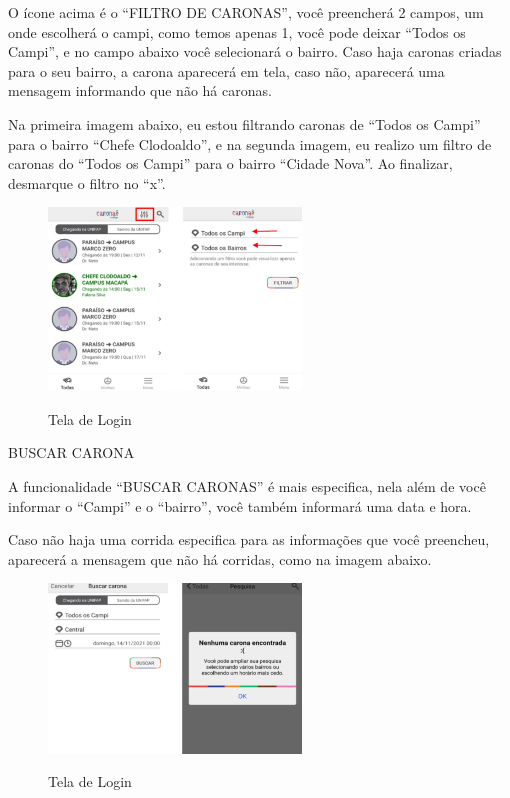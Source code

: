 O ícone acima é o “FILTRO DE CARONAS”, você preencherá 2 campos, um onde escolherá o campi, como temos apenas 1, você pode deixar “Todos os Campi”, e no campo abaixo você selecionará o bairro. Caso haja caronas criadas para o seu bairro, a carona aparecerá em tela, caso não, aparecerá uma mensagem informando que não há caronas.

Na primeira imagem abaixo, eu estou filtrando caronas de “Todos os Campi” para o bairro “Chefe Clodoaldo”, e na segunda imagem, eu realizo um filtro de caronas do “Todos os Campi” para o bairro “Cidade Nova”. Ao finalizar, desmarque o filtro no “x”.

\begin{figure}[H]
	\centering
	\caption{Tela de Login}
	\includegraphics[width=0.6\textwidth]{./04-figuras/manual/filtrar_carona.png}
	\label{fig:filtrar_carona_2}
\end{figure}

BUSCAR CARONA

A funcionalidade “BUSCAR CARONAS” é mais especifica, nela além de você informar o “Campi” e o “bairro”, você também informará uma data e hora.

Caso não haja uma corrida especifica para as informações que você preencheu, aparecerá a mensagem que não há corridas, como na imagem abaixo.

\begin{figure}[H]
	\centering
	\caption{Tela de Login}
	\includegraphics[width=0.6\textwidth]{./04-figuras/manual/buscar_carona.png}
	\label{fig:buscar_carona}
\end{figure}

